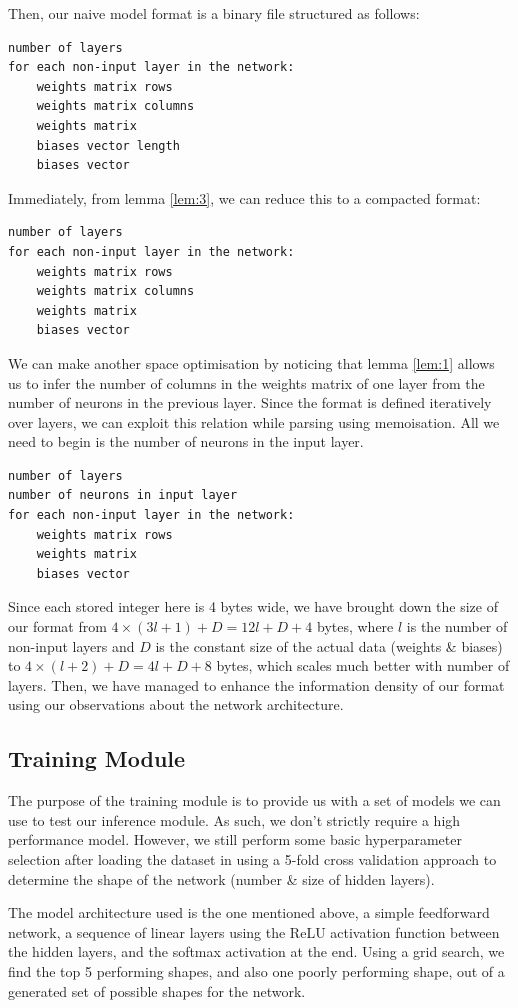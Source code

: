 \documentclass[12pt, titlepage]{article}
\begin{document}
Then, our naive model format is a binary file structured as follows:
\begin{verbatim}
number of layers
for each non-input layer in the network:
    weights matrix rows
    weights matrix columns
    weights matrix
    biases vector length
    biases vector
\end{verbatim}
Immediately, from lemma \ref{lem:3}, we can reduce this to a compacted format:
\begin{verbatim}
number of layers
for each non-input layer in the network:
    weights matrix rows
    weights matrix columns
    weights matrix
    biases vector
\end{verbatim}
We can make another space optimisation by noticing that lemma \ref{lem:1} allows us to infer the number of columns in the weights matrix of one layer from the number of neurons in the previous layer. Since the format is defined iteratively over layers, we can exploit this relation while parsing using memoisation. All we need to begin is the number of neurons in the input layer.
\begin{verbatim}
number of layers
number of neurons in input layer
for each non-input layer in the network:
    weights matrix rows
    weights matrix
    biases vector
\end{verbatim}
Since each stored integer here is 4 bytes wide, we have brought down the size of our format from $4\times (3l + 1) + D = 12l + D + 4$ bytes, where $l$ is the number of non-input layers and $D$ is the constant size of the actual data (weights \& biases) to $4\times(l + 2) + D = 4l + D + 8$ bytes, which scales much better with number of layers. Then, we have managed to enhance the information density of our format using our observations about the network architecture.

\subsection{Training Module}
The purpose of the training module is to provide us with a set of models we can use to test our inference module. As such, we don't strictly require a high performance model. However, we still perform some basic hyperparameter selection after loading the dataset in using a 5-fold cross validation approach to determine the shape of the network (number \& size of hidden layers).\bigskip

The model architecture used is the one mentioned above, a simple feedforward network, a sequence of linear layers using the ReLU activation function between the hidden layers, and the softmax activation at the end. Using a grid search, we find the top 5 performing shapes, and also one poorly performing shape, out of a generated set of possible shapes for the network.\bigskip
\end{document}
